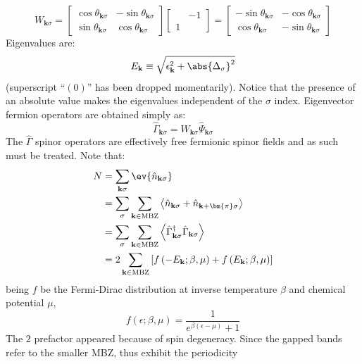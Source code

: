 \begin{equation}\label{appeq:W-explicit-form}
	W_{\mathbf{k}\sigma} = \begin{bmatrix}
		\cos \theta_{\mathbf{k}\sigma} & - \sin \theta_{\mathbf{k}\sigma} \\
		\sin \theta_{\mathbf{k}\sigma} & \cos \theta_{\mathbf{k}\sigma}
	\end{bmatrix} \begin{bmatrix}
		& -1 \\
		1 &
	\end{bmatrix} = \begin{bmatrix}
		- \sin \theta_{\mathbf{k}\sigma} & - \cos \theta_{\mathbf{k}\sigma} \\ 
		\cos \theta_{\mathbf{k}\sigma} & - \sin \theta_{\mathbf{k}\sigma}
	\end{bmatrix}
\end{equation}
Eigenvalues are:
\[
	E_\mathbf{k} \equiv \sqrt{\epsilon_{\mathbf{k}}^2 + \abs{\Delta_\sigma}^2}
\]
(superscript ``$(0)$'' has been dropped momentarily). Notice that the presence of an absolute value makes the eigenvalues independent of the $\sigma$ index. Eigenvector fermion operators are obtained simply as:
\begin{equation}\label{appeq:af-diagonalized-nambu-spinor}
	\hat\Gamma_{\mathbf{k}\sigma} = W_{\mathbf{k}\sigma} \hat \Psi_{\mathbf{k}\sigma}
\end{equation}
The $\hat\Gamma$ spinor operators are effectively free fermionic spinor fields and as such must be treated. Note that:
\begin{align}
	N &= \sum_{\mathbf{k}\sigma} \ev{\hat n_{\mathbf{k}\sigma}} \nonumber \\
	&= \sum_\sigma \sum_{\mathbf{k} \in \mathrm{MBZ}} \left\langle
		\hat n_{\mathbf{k}\sigma} + \hat n_{\mathbf{k}+\bm{\pi}\sigma}
	\right\rangle \nonumber \\
	&= \sum_\sigma \sum_{\mathbf{k} \in \mathrm{MBZ}} \left\langle
		\hat\Gamma_{\mathbf{k}\sigma}^\dagger
		\hat\Gamma_{\mathbf{k}\sigma}
	\right\rangle \nonumber \\
	&= 2 \sum_{\mathbf{k} \in \mathrm{MBZ}} \left[
		f\left(-E_\mathbf{k}; \beta,\mu \right) + f \left( E_\mathbf{k}; \beta,\mu \right)
	\right] \label{appeq:spinor-particle-number-formula}
\end{align}
being $f$ be the Fermi-Dirac distribution at inverse temperature $\beta$ and chemical potential $\mu$,
\[
	f(\epsilon;\beta,\mu) = \frac{1}{e^{\beta(\epsilon-\mu)}+1} 
\]
The $2$ prefactor appeared because of spin degeneracy. Since the gapped bands refer to the smaller MBZ, thus exhibit the periodicity
